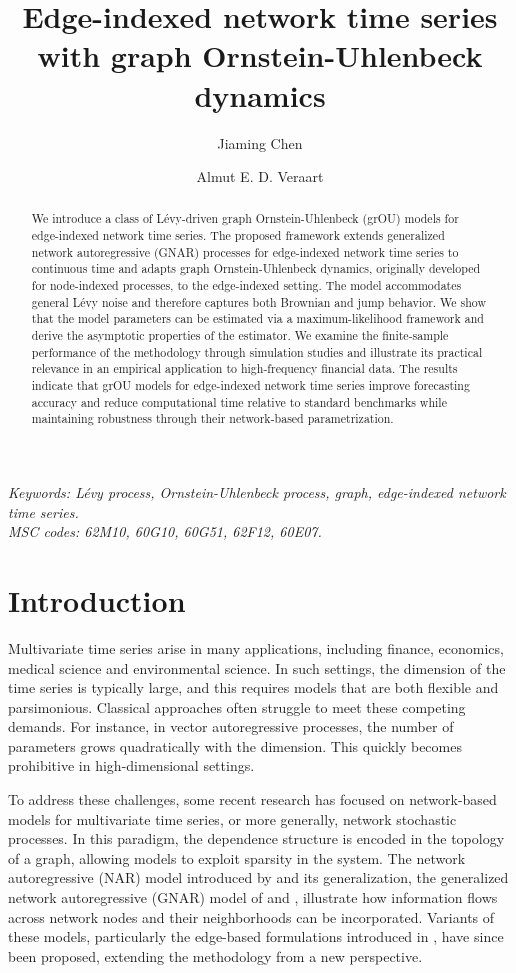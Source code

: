 \documentclass[12pt]{amsart}
\title[Edge-indexed network time series]{Edge-indexed network time series with graph Ornstein-Uhlenbeck dynamics}
\author{Jiaming Chen}
\author{Almut E. D. Veraart}
\numberwithin{equation}{section}
\newcommand{\1}{\mathbf{1}}
\begin{document}
\maketitle

\begin{abstract}
We introduce a class of L\'evy-driven graph Ornstein-Uhlenbeck (grOU) models for edge-indexed network time series. The proposed framework extends generalized network autoregressive (GNAR) processes for edge-indexed network time series to continuous time and adapts graph Ornstein-Uhlenbeck dynamics, originally developed for node-indexed processes, to the edge-indexed setting. The model accommodates general L\'evy noise and therefore captures both Brownian and jump behavior. We show that the model parameters can be estimated via a maximum-likelihood framework and derive the asymptotic properties of the estimator. We examine the finite-sample performance of the methodology through simulation studies and illustrate its practical relevance in an empirical application to high-frequency financial data. The results indicate that grOU models for edge-indexed network time series improve forecasting accuracy and reduce computational time relative to standard benchmarks while maintaining robustness through their network-based parametrization.
\end{abstract}

{\it Keywords: L\'evy process, Ornstein-Uhlenbeck process, graph, edge-indexed network time series.
}\\
{\it MSC codes: 62M10, 60G10, 60G51, 62F12, 60E07.}

\section{Introduction}
Multivariate time series arise in many applications, including finance, economics, medical science and environmental science. In such settings, the dimension of the time series is typically large, and this requires models that are both flexible and parsimonious. Classical approaches often struggle to meet these competing demands. For instance, in vector autoregressive processes, the number of parameters grows quadratically with the dimension. This quickly becomes prohibitive in high-dimensional settings. 

To address these challenges, some recent research has focused on network-based models for multivariate time series, or more generally, network stochastic processes. In this paradigm, the dependence structure is encoded in the topology of a graph, allowing models to exploit sparsity in the system. The network autoregressive (NAR) model introduced by \cite{10.1214/16-AOS1476} and its generalization, the generalized network autoregressive (GNAR) model of \cite{knight2016modelling} and \cite{knight2020generalized}, illustrate how information flows across network nodes and their neighborhoods can be incorporated. Variants of these models, particularly the edge-based formulations introduced in \cite{mantziou2023gnar}, have since been proposed, extending the methodology from a new perspective.
\end{document}
